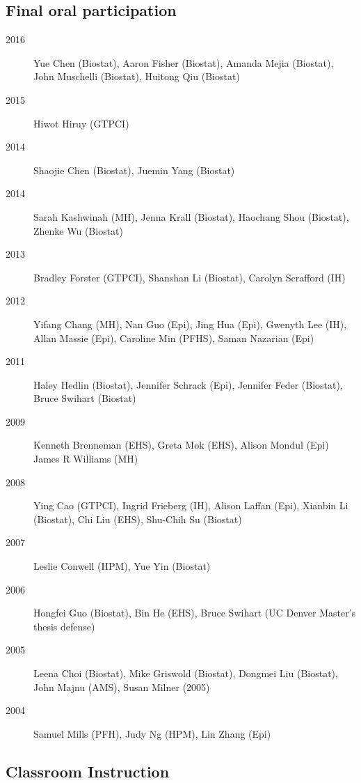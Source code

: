 \documentclass[12pt]{article}
\begin{document}
\subsection*{Final oral participation}
\begin{description}
\item[\textnormal{2016}] Yue Chen (Biostat), Aaron Fisher (Biostat), Amanda Mejia (Biostat), John Muschelli (Biostat), Huitong Qiu (Biostat)
\item[\textnormal{2015}] Hiwot Hiruy (GTPCI)
\item[\textnormal{2014}] Shaojie Chen (Biostat), Juemin Yang (Biostat)
\item[\textnormal{2014}] Sarah Kashwinah (MH), Jenna Krall (Biostat), Haochang Shou (Biostat), Zhenke Wu (Biostat)
\item[\textnormal{2013}] Bradley Forster (GTPCI), Shanshan Li (Biostat), Carolyn Scrafford (IH)
\item[\textnormal{2012}] Yifang Chang (MH), Nan Guo (Epi), Jing Hua (Epi), Gwenyth Lee (IH), Allan Massie (Epi), Caroline Min (PFHS),  Saman Nazarian (Epi)
\item[\textnormal{2011}] Haley Hedlin (Biostat), Jennifer Schrack (Epi), Jennifer Feder (Biostat), Bruce Swihart (Biostat)
\item[\textnormal{2009}] Kenneth Brenneman (EHS), Greta Mok (EHS), Alison Mondul (Epi) James R Williams (MH) 
\item[\textnormal{2008}] Ying Cao (GTPCI), Ingrid Frieberg (IH), Alison Laffan (Epi), Xianbin Li (Biostat), Chi Liu 
(EHS), Shu-Chih Su (Biostat) 
\item[\textnormal{2007}] Leslie Conwell (HPM), Yue Yin (Biostat) 
\item[\textnormal{2006}] Hongfei Guo (Biostat), Bin He (EHS), Bruce Swihart (UC Denver Master’s thesis defense) 
\item[\textnormal{2005}] Leena Choi (Biostat), Mike Griswold (Biostat), Dongmei Liu (Biostat), John Majnu (AMS), 
Susan Milner (2005) 
\item[\textnormal{2004}] Samuel Mills (PFH), Judy Ng (HPM), Lin Zhang (Epi)
\end{description}

\subsection*{Classroom Instruction}
\end{document}
